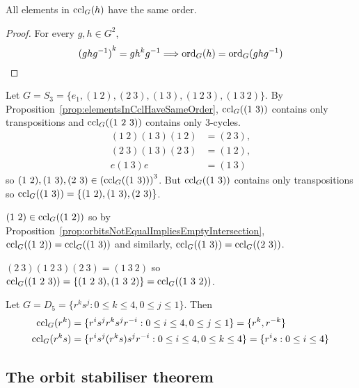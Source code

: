 \begin{proposition}\label{prop:elementsInCclHaveSameOrder}
	All elements in $\text{ccl}_G(h)$ have the same order.
\end{proposition}

\begin{proof}
	For every $g, h \in G^2$,
	\[
		{(g h g^{-1})}^k = g h^k g^{-1} \Longrightarrow \text{ord}_G(h) = \text{ord}_G(g h g^{-1})
	\]
\end{proof}

\begin{example}
	Let $G = S_3 = \{ e_1, (1 \ 2), (2 \ 3), (1 \ 3), (1 \ 2 \ 3), (1 \ 3 \ 2) \}$. By Proposition~\ref{prop:elementsInCclHaveSameOrder}, $\text{ccl}_G ((1 \ 3))$ contains only transpositions and $\ccl_G((1 \ 2 \ 3))$ contains only $3$-cycles.
	\[
		\begin{aligned}
			(1 \ 2) (1 \ 3) (1 \ 2) & = (2 \ 3), \\
			(2 \ 3) (1 \ 3) (2 \ 3) & = (1 \ 2), \\
			e (1 \ 3) e & = (1 \ 3)
		\end{aligned}
	\]
	so $(1 \ 2), (1 \ 3), (2 \ 3) \in {(\ccl_G((1 \ 3)))}^3$. But $\text{ccl}_G((1 \ 3))$ contains only transpositions so $\ccl_G((1 \ 3)) = \{ (1 \ 2), (1 \ 3), (2 \ 3) \}$.

	$(1 \ 2) \in \text{ccl}_G((1 \ 2))$ so by Proposition~\ref{prop:orbitsNotEqualImpliesEmptyIntersection}, $\text{ccl}_G((1 \ 2)) = \text{ccl}_G((1 \ 3))$ and similarly, $\ccl_G((1 \ 3)) = \ccl_G((2 \ 3))$.

	$(2 \ 3)(1 \ 2 \ 3)(2 \ 3) = (1 \ 3 \ 2)$ so $\ccl_G((1 \ 2 \ 3)) = \{ (1 \ 2 \ 3), (1 \ 3 \ 2) \} = \ccl_G((1 \ 3 \ 2))$.
\end{example}

\begin{example}
	Let $G = D_5 = \{ r^k s^j: 0 \le k \le 4, 0 \le j \le 1 \}$. Then
	\[
		\begin{aligned}
			\text{ccl}_G(r^k) & = \{ r^i s^j r^k s^j r^{-i}: 0 \le i \le 4, 0 \le j \le 1 \} = \{ r^k, r^{-k} \} \\
			\text{ccl}_G(r^k s) & = \{ r^i s^j (r^k s) s^j r^{-i}: 0 \le i \le 4, 0 \le k \le 4 \} = \{ r^i s: 0 \le i \le 4 \}
		\end{aligned}
	\]
\end{example}

\subsection{The orbit stabiliser theorem}

